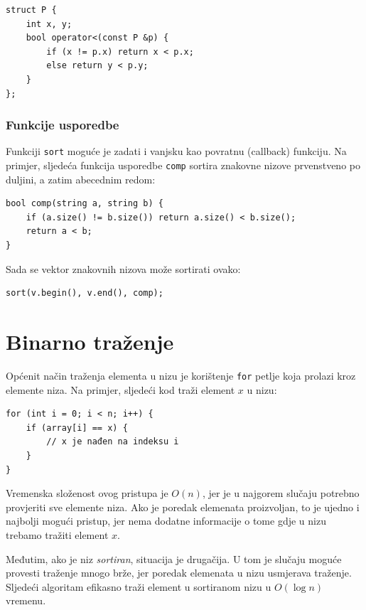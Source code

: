 \begin{lstlisting}
struct P {
    int x, y;
    bool operator<(const P &p) {
        if (x != p.x) return x < p.x;
        else return y < p.y;
    }
};
\end{lstlisting}

\subsubsection{Funkcije usporedbe}


Funkciji \texttt{sort} moguće je zadati i vanjsku
kao povratnu (callback) funkciju.
Na primjer, sljedeća funkcija usporedbe \texttt{comp}
sortira znakovne nizove prvenstveno po duljini, a zatim
abecednim redom:

\begin{lstlisting}
bool comp(string a, string b) {
    if (a.size() != b.size()) return a.size() < b.size();
    return a < b;
}
\end{lstlisting}
Sada se vektor znakovnih nizova može sortirati ovako:
\begin{lstlisting}
sort(v.begin(), v.end(), comp);
\end{lstlisting}

\section{Binarno traženje}


Općenit način traženja elementa
u nizu je korištenje \texttt{for} petlje
koja prolazi kroz elemente niza.
Na primjer, sljedeći kod traži
element $x$ u nizu:

\begin{lstlisting}
for (int i = 0; i < n; i++) {
    if (array[i] == x) {
        // x je nađen na indeksu i
    }
}
\end{lstlisting}

Vremenska složenost ovog pristupa je $O(n)$,
jer je u najgorem slučaju potrebno provjeriti
sve elemente niza.
Ako je poredak elemenata proizvoljan,
to je ujedno i najbolji mogući pristup, jer
nema dodatne informacije o tome gdje
u nizu trebamo tražiti element $x$.

Međutim, ako je niz \emph{sortiran},
situacija je drugačija.
U tom je slučaju moguće provesti
traženje mnogo brže, jer poredak
elemenata u nizu usmjerava traženje.
Sljedeći algoritam 
efikasno traži element u sortiranom nizu
u $O(\log n)$ vremenu.

